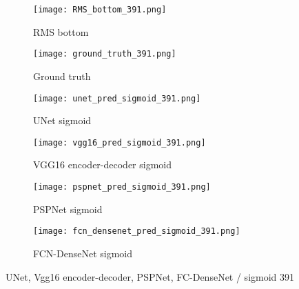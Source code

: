 	
	\begin{figure} [!h]
		\centering
		\begin{subfigure}[b]{0.47\textwidth}
			\centering
			\texttt{[image: RMS\_bottom\_391.png]}
			\caption{RMS bottom}
			\label{fig:RMS_flat_shell_Vz_391}
		\end{subfigure}
		\hfill
		\begin{subfigure}[b]{0.47\textwidth}
			\centering
			\texttt{[image: ground\_truth\_391.png]}
			\caption{Ground truth}
			\label{fig:m1_rand_single_delam_391}
		\end{subfigure}
		\begin{subfigure}[b]{0.47\textwidth}
			\centering
			\texttt{[image: unet\_pred\_sigmoid\_391.png]}
			\caption{UNet sigmoid}
			\label{fig:unet_pred_sigmoid_391}
		\end{subfigure}
		\hfill
		\begin{subfigure}[b]{0.47\textwidth}
			\centering
			\texttt{[image: vgg16\_pred\_sigmoid\_391.png]}
			\caption{VGG16 encoder-decoder sigmoid}
			\label{fig:vgg16_pred_sigmoid_391}
		\end{subfigure}
		\hfill
		\begin{subfigure}[b]{0.47\textwidth}
			\centering
			\texttt{[image: pspnet\_pred\_sigmoid\_391.png]}
			\caption{PSPNet sigmoid}
			\label{fig:pspnet_pred_sigmoid_391}
		\end{subfigure}
		\hfill
		\begin{subfigure}[b]{0.47\textwidth}
			\centering
			\texttt{[image: fcn\_densenet\_pred\_sigmoid\_391.png]}
			\caption{FCN-DenseNet sigmoid}
			\label{fig:fcn_densenet_pred_sigmoid_391}
		\end{subfigure}
		\caption{UNet, Vgg16 encoder-decoder, PSPNet, FC-DenseNet / sigmoid 391}
		\label{fig:391_sigmoid}
	\end{figure} 


